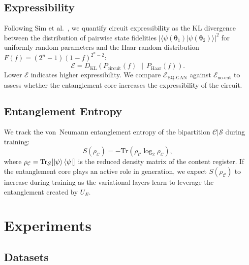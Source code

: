 \documentclass[twocolumn]{article}
\begin{document}
\subsection{Expressibility}

Following Sim et al.\ \cite{sim2019expressibility}, we quantify circuit
expressibility as the KL divergence between the distribution of pairwise
state fidelities $|\langle\psi(\boldsymbol{\theta}_1)|\psi(\boldsymbol{\theta}_2)\rangle|^2$
for uniformly random parameters and the Haar-random distribution
$F(f) = (2^n - 1)(1-f)^{2^n - 2}$:
\begin{equation}
  \mathcal{E} = D_\text{KL}\!\left(P_\text{circuit}(f) \,\|\, P_\text{Haar}(f)\right).
\end{equation}
Lower $\mathcal{E}$ indicates higher expressibility. We compare
$\mathcal{E}_\text{EQ-GAN}$ against $\mathcal{E}_\text{no-ent}$ to assess
whether the entanglement core increases the expressibility of the circuit.

\subsection{Entanglement Entropy}

We track the von~Neumann entanglement entropy of the bipartition
$\mathcal{C} | \mathcal{S}$ during training:
\begin{equation}
  S(\rho_\mathcal{C}) = -\text{Tr}(\rho_\mathcal{C} \log_2 \rho_\mathcal{C}),
\end{equation}
where $\rho_\mathcal{C} = \text{Tr}_\mathcal{S}[\ket{\psi}\bra{\psi}]$ is the
reduced density matrix of the content register. If the entanglement core plays
an active role in generation, we expect $S(\rho_\mathcal{C})$ to increase
during training as the variational layers learn to leverage the entanglement
created by $U_E$.

\section{Experiments}
\label{sec:experiments}

\subsection{Datasets}
\end{document}
